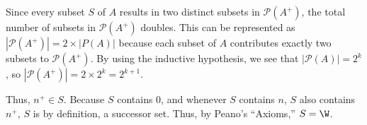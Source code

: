 {\begin{itemize}
                    Since every subset $S$ of $A$ results in two distinct subsets in $\mathcal{P}(A^+)$, the total number of subsets in $\mathcal{P}(A^+)$ doubles. This can be represented as $|\mathcal{P}(A^+)| = 2 \times |P(A)|$ because each subset of $A$ contributes exactly two subsets to $\mathcal{P}(A^+)$. By using the inductive hypothesis, we see that $|\mathcal{P}(A)| = 2^k$, so $|\mathcal{P}(A^+)| = 2 \times 2^k = 2^{k+1}$.
                \end{itemize}
                Thus, $n^+ \in S$. Because $S$ contains 0, and whenever $S$ contains $n$, $S$ also contains $n^+$, $S$ is by definition, a successor set. Thus, by Peano's ``Axioms,'' $S = \W$.
            }


    
